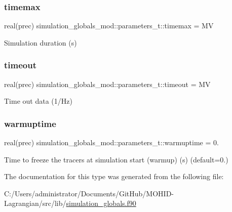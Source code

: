 \subsubsection{\texorpdfstring{timemax}{timemax}}
{\footnotesize\ttfamily real(prec) simulation\+\_\+globals\+\_\+mod\+::parameters\+\_\+t\+::timemax = MV\hspace{0.3cm}{\ttfamily [private]}}



Simulation duration (s) 

\mbox{\label{structsimulation__globals__mod_1_1parameters__t_af4190961e6191cf07a9b04b0b864ec95}} 
\subsubsection{\texorpdfstring{timeout}{timeout}}
{\footnotesize\ttfamily real(prec) simulation\+\_\+globals\+\_\+mod\+::parameters\+\_\+t\+::timeout = MV\hspace{0.3cm}{\ttfamily [private]}}



Time out data (1/\+Hz) 

\mbox{\label{structsimulation__globals__mod_1_1parameters__t_aed7511e2225ac602d053476e4688d49a}} 
\subsubsection{\texorpdfstring{warmuptime}{warmuptime}}
{\footnotesize\ttfamily real(prec) simulation\+\_\+globals\+\_\+mod\+::parameters\+\_\+t\+::warmuptime = 0.\hspace{0.3cm}{\ttfamily [private]}}



Time to freeze the tracers at simulation start (warmup) (s) (default=0.) 



The documentation for this type was generated from the following file\+:\begin{DoxyCompactItemize}
\item 
C\+:/\+Users/administrator/\+Documents/\+Git\+Hub/\+M\+O\+H\+I\+D-\/\+Lagrangian/src/lib/\hyperlink{simulation__globals_8f90}{simulation\+\_\+globals.\+f90}\end{DoxyCompactItemize}
